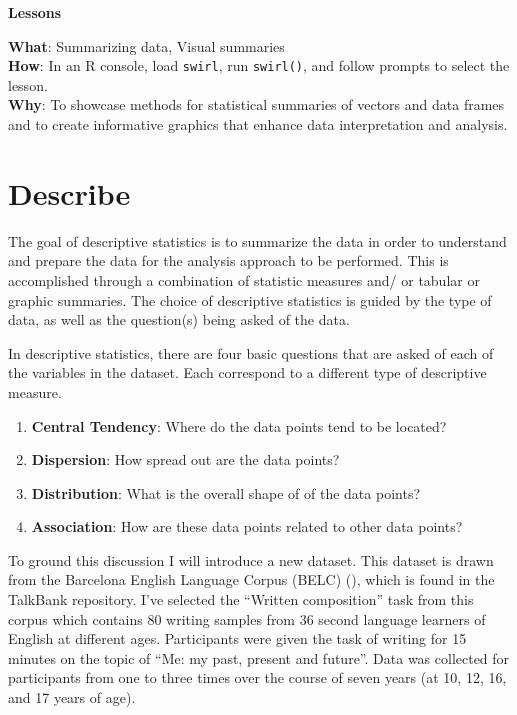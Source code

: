 \documentclass[
  letterpaper,
]{latex/krantz}
\providecommand{\tightlist}{%
  \setlength{\itemsep}{0pt}\setlength{\parskip}{0pt}}\usepackage{longtable,booktabs,array}
\theoremstyle{definition}
\theoremstyle{remark}
\begin{document}
\begin{tcolorbox}[enhanced jigsaw, breakable, leftrule=.75mm, arc=.35mm, colframe=quarto-callout-color-frame, colback=white, left=2mm, bottomrule=.15mm, rightrule=.15mm, toprule=.15mm, opacityback=0]

\textbf{ Lessons}

\textbf{What}: Summarizing data, Visual summaries\\
\textbf{How}: In an R console, load \texttt{swirl}, run
\texttt{swirl()}, and follow prompts to select the lesson.\\
\textbf{Why}: To showcase methods for statistical summaries of vectors
and data frames and to create informative graphics that enhance data
interpretation and analysis.

\end{tcolorbox}

\section{Describe}\label{sec-aa-describe}

The goal of descriptive statistics is to summarize the data in order to
understand and prepare the data for the analysis approach to be
performed. This is accomplished through a combination of statistic
measures and/ or tabular or graphic summaries. The choice of descriptive
statistics is guided by the type of data, as well as the question(s)
being asked of the data.

In descriptive statistics, there are four basic questions that are asked
of each of the variables in the dataset. Each correspond to a different
type of descriptive measure.

\begin{enumerate}
\def\labelenumi{\arabic{enumi}.}
\tightlist
\item
  \textbf{Central Tendency}: Where do the data points tend to be
  located?
\item
  \textbf{Dispersion}: How spread out are the data points?
\item
  \textbf{Distribution}: What is the overall shape of of the data
  points?
\item
  \textbf{Association}: How are these data points related to other data
  points?
\end{enumerate}

To ground this discussion I will introduce a new dataset. This dataset
is drawn from the Barcelona English Language Corpus (BELC)
(), which is found in the TalkBank
repository. I've selected the ``Written composition'' task from this
corpus which contains 80 writing samples from 36 second language
learners of English at different ages. Participants were given the task
of writing for 15 minutes on the topic of ``Me: my past, present and
future''. Data was collected for participants from one to three times
over the course of seven years (at 10, 12, 16, and 17 years of age).
\end{document}
